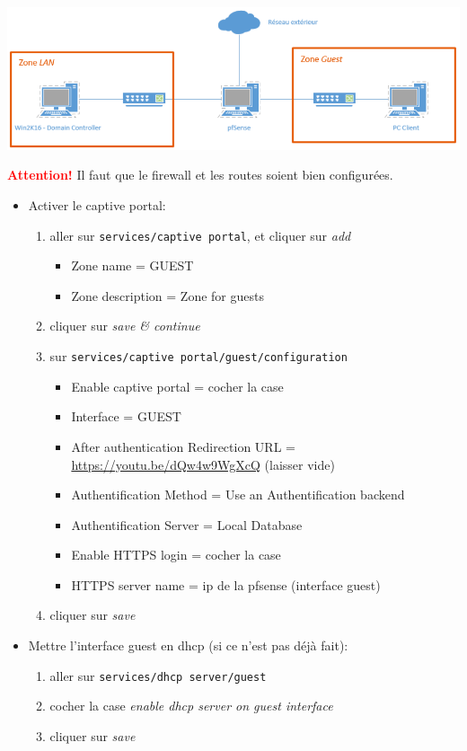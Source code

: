 \documentclass[a4paper]{article}
\begin{document}
\begin{center} \includegraphics[width=0.99\linewidth]{images/captive-portal-01.PNG} \end{center}
\textcolor{red}{\textbf{Attention!}} Il faut que le firewall et les routes soient bien configurées.
\begin{itemize}

\item Activer le captive portal:
\begin{enumerate}
    \item aller sur \texttt{services/captive portal}, et cliquer sur \textit{add}
    \begin{itemize}
        \item Zone name = GUEST
        \item Zone description = Zone for guests
    \end{itemize}
    \item cliquer sur \textit{save \& continue}
    \item sur \texttt{services/captive portal/guest/configuration}
    \begin{itemize}
        \item Enable captive portal = cocher la case
        \item Interface = GUEST
        \item After authentication Redirection URL = \url{https://youtu.be/dQw4w9WgXcQ} (laisser vide)
        \item Authentification Method = Use an Authentification backend
        \item Authentification Server = Local Database
        \item Enable HTTPS login = cocher la case
        \item HTTPS server name = ip de la pfsense (interface guest)
    \end{itemize}
    \item cliquer sur \textit{save}
\end{enumerate}

\item Mettre l'interface guest en dhcp (si ce n'est pas déjà fait):
\begin{enumerate}
    \item aller sur \texttt{services/dhcp server/guest}
    \item cocher la case \textit{enable dhcp server on guest interface}
    \item cliquer sur \textit{save}
\end{enumerate}


\end{itemize}
\end{document}
